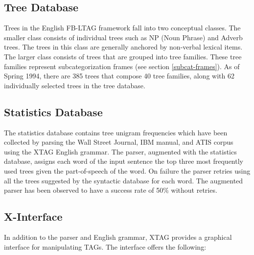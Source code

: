 \subsection{Tree Database} 
\label{tree-db}
Trees in the English FB-LTAG framework fall into two conceptual classes.  The
smaller class consists of individual trees such as NP (Noun Phrase) and Adverb
trees.  The trees in this class are generally anchored by non-verbal lexical
items. The larger class consists of trees that are grouped into tree families.
These tree families represent subcategorization frames (see section
\ref{subcat-frames}).  As of Spring 1994, there are 385 trees that compose 40
tree families, along with 62 individually selected trees in the tree database.


\subsection{Statistics Database}
\label{stat-db}
The statistics database contains tree unigram frequencies which have been
collected by parsing the Wall Street Journal, IBM manual, and ATIS corpus using
the XTAG English grammar. The parser, augmented with the statistics database,
assigns each word of the input sentence the top three most frequently used
trees given the part-of-speech of the word. On failure the parser retries using
all the trees suggested by the syntactic database for each word.  The augmented
parser has been observed to have a success rate of 50\% without retries.

\subsection{X-Interface}

In addition to the parser and English grammar, XTAG provides a graphical
interface for manipulating TAGs.  The interface offers the following:

